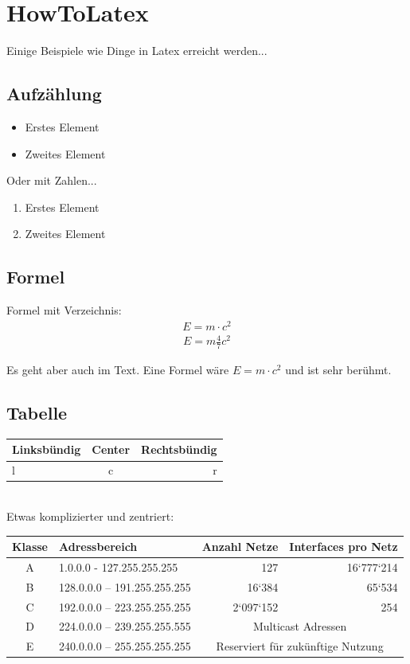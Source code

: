 \section{HowToLatex}

Einige Beispiele wie Dinge in Latex erreicht werden...


\subsection{Aufzählung}
\begin{itemize}
	\item Erstes Element
	\item Zweites Element
\end{itemize}

Oder mit Zahlen...

\begin{enumerate}
	\item Erstes Element
	\item Zweites Element
\end{enumerate}

\subsection{Formel}
Formel mit Verzeichnis:\\
\begin{align}
    E = m \cdot c^2
\end{align}
\begin{align}
	E = m \frac{4}{7} c^2
\end{align}

Es geht aber auch im Text. Eine Formel wäre $ E=m\cdot c^2 $ und ist sehr berühmt.

\subsection{Tabelle}

\begin{tabular}{|l|c|r|} \hline
Linksbündig & Center & Rechtsbündig \\ \hline 
l & c & r \\ \hline 
\end{tabular}\\

Etwas komplizierter und zentriert:
\begin{center}
\begin{tabular}{|c|l|r|r|} \hline
	\textbf{Klasse} & \textbf{Adressbereich} & \textbf{Anzahl Netze} & \textbf{Interfaces pro Netz} \\ \hline
	A & 1.0.0.0 - 127.255.255.255 & 127 & 16‘777‘214 \\ \hline
	B & 128.0.0.0 – 191.255.255.255 & 16‘384 & 65‘534 \\ \hline
	C & 192.0.0.0 – 223.255.255.255 & 2‘097‘152 & 254 \\ \hline
	D & 224.0.0.0 – 239.255.255.555 & \multicolumn{2}{|c|}{Multicast Adressen} \\ \hline
	E & 240.0.0.0 – 255.255.255.255 & \multicolumn{2}{|c|}{Reserviert für zukünftige Nutzung} \\ \hline
\end{tabular}
\end{center}


